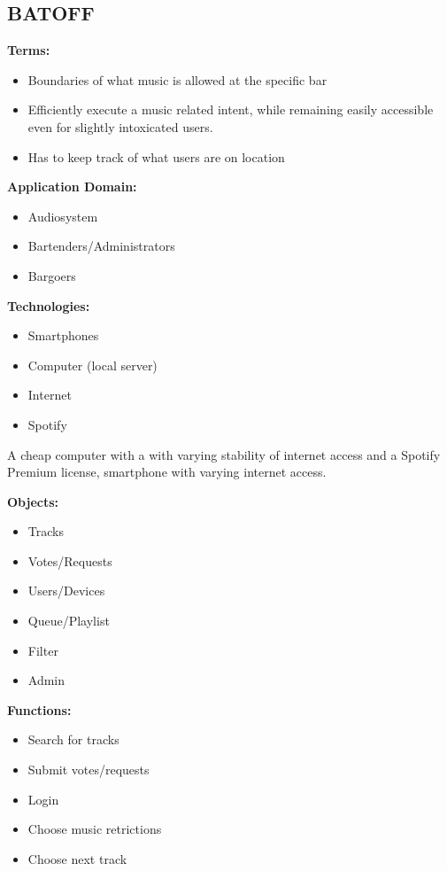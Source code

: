 \subsection{BATOFF}
\textbf{Terms:}
\begin{itemize}
	\item Boundaries of what music is allowed at the specific bar 
	\item Efficiently execute a music related intent, while remaining easily accessible even for slightly intoxicated users.	
	\item Has to keep track of what users are on location
\end{itemize}

\textbf{Application Domain:}
\begin{itemize}
	\item Audiosystem
	\item Bartenders/Administrators	
	\item Bargoers
\end{itemize}

\textbf{Technologies:}
\begin{itemize}
	\item Smartphones
	\item Computer (local server)	
	\item Internet
	\item Spotify
\end{itemize}

A cheap computer with a with varying stability of internet access and a Spotify Premium license, smartphone with varying internet access.

\textbf{Objects:}
\begin{itemize}
	\item Tracks
	\item Votes/Requests	
	\item Users/Devices
	\item Queue/Playlist
	\item Filter
	\item Admin
\end{itemize}

\textbf{Functions:}
\begin{itemize}
	\item Search for tracks
	\item Submit votes/requests	
	\item Login
	\item Choose music retrictions
	\item Choose next track
\end{itemize}

